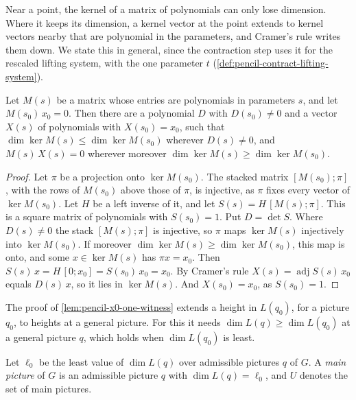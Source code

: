 Near a point, the kernel of a matrix of polynomials can only lose
dimension. Where it keeps its dimension, a kernel vector at the point
extends to kernel vectors nearby that are polynomial in the parameters,
and Cramer's rule writes them down. We state this in general, since the
contraction step uses it for the rescaled lifting system, with the one
parameter $t$ (\cref{def:pencil-contract-lifting-system}).

\begin{lemma}
  \label{lem:pencil-polynomial-section}
  \leanok
  Let $M(s)$ be a matrix whose entries are polynomials in parameters
  $s$, and let $M(s_0)\, x_0 = 0$. Then there are a polynomial $D$ with
  $D(s_0) \neq 0$ and a vector $X(s)$ of polynomials with
  $X(s_0) = x_0$, such that $\dim \ker M(s) \le \dim \ker M(s_0)$
  wherever $D(s) \neq 0$, and $M(s)\, X(s) = 0$ wherever moreover
  $\dim \ker M(s) \ge \dim \ker M(s_0)$.
\end{lemma}
\begin{proof}
  \leanok
  Let $\pi$ be a projection onto $\ker M(s_0)$. The stacked
  matrix $[M(s_0); \pi]$, with the rows of $M(s_0)$ above those of $\pi$,
  is injective, as $\pi$ fixes every vector of $\ker M(s_0)$. Let $H$ be
  a left inverse of it, and let $S(s) = H\,[M(s); \pi]$. This is a square
  matrix of polynomials with $S(s_0) = 1$. Put $D = \det S$. Where
  $D(s) \neq 0$ the stack $[M(s); \pi]$ is injective, so $\pi$ maps
  $\ker M(s)$ injectively into $\ker M(s_0)$. If moreover
  $\dim \ker M(s) \ge \dim \ker M(s_0)$, this map is onto, and some
  $x \in \ker M(s)$ has $\pi x = x_0$. Then
  $S(s)\, x = H\,[0; x_0] = S(s_0)\, x_0 = x_0$. By Cramer's rule
  $X(s) = \operatorname{adj} S(s)\, x_0$ equals $D(s)\, x$, so it lies in
  $\ker M(s)$. And $X(s_0) = x_0$, as $S(s_0) = 1$.
\end{proof}

The proof of \cref{lem:pencil-x0-one-witness} extends a height in
$L(q_0)$, for a picture $q_0$, to heights at a general picture. For this
it needs $\dim L(q) \ge \dim L(q_0)$ at a general picture $q$, which
holds when $\dim L(q_0)$ is least.

\begin{definition}
  \label{def:pencil-main-picture}
  \leanok
  Let $\ell_0$ be the least value of $\dim L(q)$ over admissible
  pictures $q$ of $G$. A \emph{main picture} of $G$ is an admissible
  picture $q$ with $\dim L(q) = \ell_0$, and $U$ denotes the set of main
  pictures.
\end{definition}

